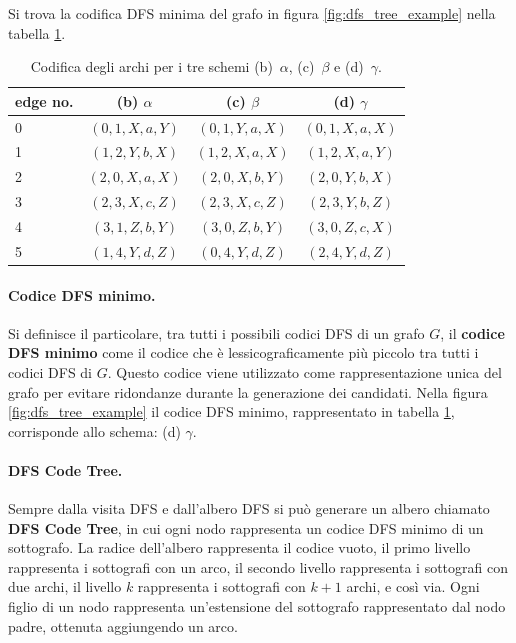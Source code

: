 \noindent
Si trova la codifica DFS minima del grafo in figura \ref{fig:dfs_tree_example} nella tabella \ref{tab:dfs_code_example}.

\begin{table}[htbp]
\centering
\begin{tabular}{lccc}
\toprule
\textbf{edge no.} & \textbf{(b) $\alpha$} & \textbf{(c) $\beta$} & \textbf{(d) $\gamma$} \\
\midrule
0 & $(0,1,X,a,Y)$ & $(0,1,Y,a,X)$ & $(0,1,X,a,X)$ \\
1 & $(1,2,Y,b,X)$ & $(1,2,X,a,X)$ & $(1,2,X,a,Y)$ \\
2 & $(2,0,X,a,X)$ & $(2,0,X,b,Y)$ & $(2,0,Y,b,X)$ \\
3 & $(2,3,X,c,Z)$ & $(2,3,X,c,Z)$ & $(2,3,Y,b,Z)$ \\
4 & $(3,1,Z,b,Y)$ & $(3,0,Z,b,Y)$ & $(3,0,Z,c,X)$ \\
5 & $(1,4,Y,d,Z)$ & $(0,4,Y,d,Z)$ & $(2,4,Y,d,Z)$ \\
\bottomrule
\end{tabular}
\caption{Codifica degli archi per i tre schemi (b)~$\alpha$, (c)~$\beta$ e (d)~$\gamma$.}
\label{tab:dfs_code_example}
\end{table}

\paragraph{Codice DFS minimo.}
Si definisce il particolare, tra tutti i possibili codici DFS di un grafo $G$, il \textbf{codice DFS minimo} come il codice che è lessicograficamente più piccolo tra tutti i codici DFS di $G$. Questo codice viene utilizzato come rappresentazione unica del grafo per evitare ridondanze durante la generazione dei candidati. Nella figura \ref{fig:dfs_tree_example} il codice DFS minimo, rappresentato in tabella \ref{tab:dfs_code_example}, corrisponde allo schema: (d) $\gamma$.

\paragraph{DFS Code Tree.}
Sempre dalla visita DFS e dall'albero DFS si può generare un albero chiamato \textbf{DFS Code Tree}, in cui ogni nodo rappresenta un codice DFS minimo di un sottografo. La radice dell'albero rappresenta il codice vuoto, il primo livello rappresenta i sottografi con un arco, il secondo livello rappresenta i sottografi con due archi, il livello $k$ rappresenta i sottografi con $k+1$ archi, e così via. Ogni figlio di un nodo rappresenta un'estensione del sottografo rappresentato dal nodo padre, ottenuta aggiungendo un arco.

